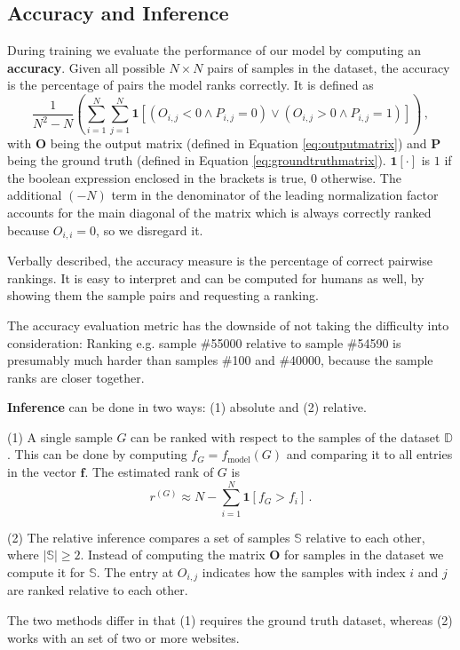 \subsection{Accuracy and Inference}
\label{sec:accuracy}

During training we evaluate the performance of our model by computing an \textbf{accuracy}. Given all possible $N\times N$ pairs of samples in the dataset, the accuracy is the percentage of pairs the model ranks correctly. It is defined as \begin{equation}\label{eq:acc}
    \frac{1}{N^2-N}\left(\sum_{i=1}^N\sum_{j=1}^N\bm{1}\left[\left(O_{i,j}<0\land P_{i,j}=0\right)\lor\left(O_{i,j}>0\land P_{i,j}=1\right)\right]\right)\,,
\end{equation}with $\bm{O}$ being the output matrix (defined in Equation \ref{eq:outputmatrix}) and $\bm{P}$ being the ground truth (defined in Equation \ref{eq:groundtruthmatrix}). $\bm{1}\left[\cdot\right]$ is $1$ if the boolean expression enclosed in the brackets is true, $0$ otherwise. The additional $(-N)$ term in the denominator of the leading normalization factor accounts for the main diagonal of the matrix which is always correctly ranked because $O_{i,i}=0$, so we disregard it.

Verbally described, the accuracy measure is the percentage of correct pairwise rankings. It is easy to interpret and can be computed for humans as well, by showing them the sample pairs and requesting a ranking.

The accuracy evaluation metric has the downside of not taking the difficulty into consideration: Ranking e.g. sample \#55000 relative to sample \#54590 is presumably much harder than samples \#100 and \#40000, because the sample ranks are closer together.

\textbf{Inference} can be done in two ways: (1) absolute and (2) relative.

(1) A single sample $G$ can be ranked with respect to the samples of the dataset $\mathbb{D}$. This can be done by computing $f_G=f_\text{model}(G)$ and comparing it to all entries in the vector $\bm{f}$. The estimated rank of $G$ is \begin{equation}
    \label{eq:inference}
    r^{(G)}\approx N-\sum_{i=1}^N\bm{1}\left[f_G>f_i\right]\,.
\end{equation}

(2) The relative inference compares a set of samples $\mathbb{S}$ relative to each other, where $\left\lvert\mathbb{S}\right\rvert\ge2$. Instead of computing the matrix $\bm{O}$ for samples in the dataset we compute it for $\mathbb{S}$. The entry at $O_{i,j}$ indicates how the samples with index $i$ and $j$ are ranked relative to each other.

The two methods differ in that (1) requires the ground truth dataset, whereas (2) works with an set of two or more websites.

